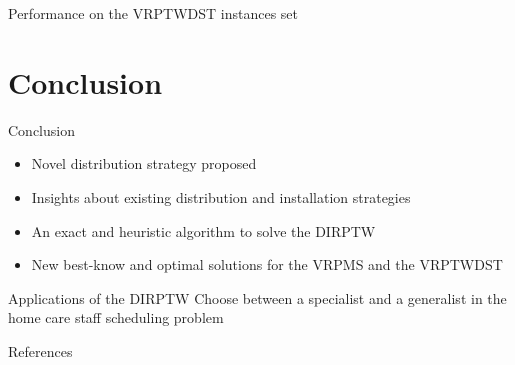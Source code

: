 \documentclass[9pt,xcolor={dvipsnames}]{beamer}
\begin{document}
\begin{frame}[allowframebreaks]{Performance on the VRPTWDST instances set}
{\begin{table}[]
\centering
\caption{Lower and upper bounds for the VRPTWDST for the secondary objective of minimizing travelled distance}
\label{tab:random}
\end{table}}

\end{frame}


\section{Conclusion}
\begin{frame}{Conclusion}

	\begin{itemize}
		\item Novel distribution strategy proposed
		\item Insights about existing distribution and installation strategies
		\item An exact and heuristic algorithm to solve the DIRPTW
		\item New best-know and optimal solutions for the VRPMS and the VRPTWDST
	\end{itemize}
	\begin{block}{Applications of the DIRPTW}
		Choose between a specialist and a generalist in the home care staff scheduling problem
	\end{block}
\end{frame}

\appendix

\begin{frame}[allowframebreaks]{References}

  
  

\end{frame}
\end{document}
